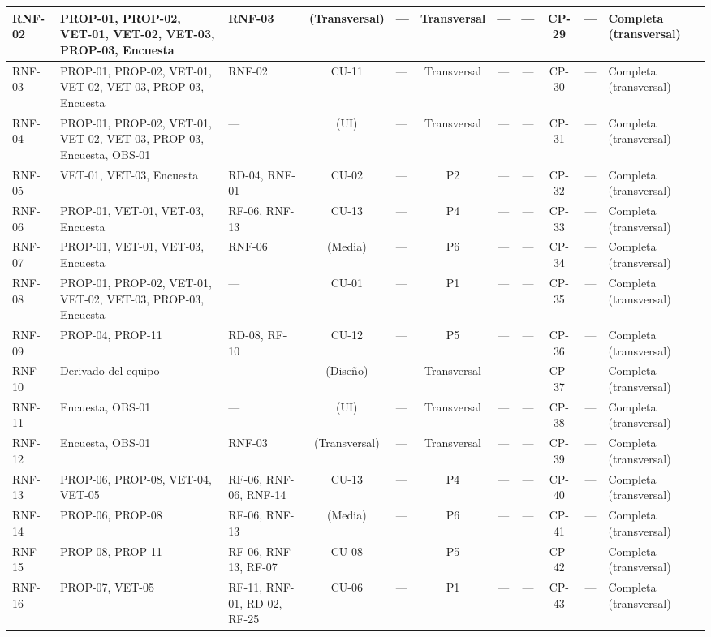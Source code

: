 \documentclass[journal,onecolumn]{IEEEtran}
\begin{document}
\begin{landscape}
\begin{table}[H]
\begin{tabularx}{\linewidth}{|l|X|X|c|X|c|c|c|c|c|X|}
			RNF-02 & PROP-01, PROP-02, VET-01, VET-02, VET-03, PROP-03, Encuesta & RNF-03 & (Transversal) & --- & Transversal & --- & --- & CP-29 & --- & Completa (transversal) \\ \hline
			RNF-03 & PROP-01, PROP-02, VET-01, VET-02, VET-03, PROP-03, Encuesta & RNF-02 & CU-11 & --- & Transversal & --- & --- & CP-30 & --- & Completa (transversal) \\ \hline
			RNF-04 & PROP-01, PROP-02, VET-01, VET-02, VET-03, PROP-03, Encuesta, OBS-01 & --- & (UI) & --- & Transversal & --- & --- & CP-31 & --- & Completa (transversal) \\ \hline
			RNF-05 & VET-01, VET-03, Encuesta & RD-04, RNF-01 & CU-02 & --- & P2 & --- & --- & CP-32 & --- & Completa (transversal) \\ \hline
			RNF-06 & PROP-01, VET-01, VET-03, Encuesta & RF-06, RNF-13 & CU-13 & --- & P4 & --- & --- & CP-33 & --- & Completa (transversal) \\ \hline
			RNF-07 & PROP-01, VET-01, VET-03, Encuesta & RNF-06 & (Media) & --- & P6 & --- & --- & CP-34 & --- & Completa (transversal) \\ \hline
			RNF-08 & PROP-01, PROP-02, VET-01, VET-02, VET-03, PROP-03, Encuesta & --- & CU-01 & --- & P1 & --- & --- & CP-35 & --- & Completa (transversal) \\ \hline
			RNF-09 & PROP-04, PROP-11 & RD-08, RF-10 & CU-12 & --- & P5 & --- & --- & CP-36 & --- & Completa (transversal) \\ \hline
			RNF-10 & Derivado del equipo & --- & (Diseño) & --- & Transversal & --- & --- & CP-37 & --- & Completa (transversal) \\ \hline
			RNF-11 & Encuesta, OBS-01 & --- & (UI) & --- & Transversal & --- & --- & CP-38 & --- & Completa (transversal) \\ \hline
			RNF-12 & Encuesta, OBS-01 & RNF-03 & (Transversal) & --- & Transversal & --- & --- & CP-39 & --- & Completa (transversal) \\ \hline
			RNF-13 & PROP-06, PROP-08, VET-04, VET-05 & RF-06, RNF-06, RNF-14 & CU-13 & --- & P4 & --- & --- & CP-40 & --- & Completa (transversal) \\ \hline
			RNF-14 & PROP-06, PROP-08 & RF-06, RNF-13 & (Media) & --- & P6 & --- & --- & CP-41 & --- & Completa (transversal) \\ \hline
			RNF-15 & PROP-08, PROP-11 & RF-06, RNF-13, RF-07 & CU-08 & --- & P5 & --- & --- & CP-42 & --- & Completa (transversal) \\ \hline
			RNF-16 & PROP-07, VET-05 & RF-11, RNF-01, RD-02, RF-25 & CU-06 & --- & P1 & --- & --- & CP-43 & --- & Completa (transversal) \\ \hline
		\end{tabularx}
	\end{table}
\end{landscape}
\end{document}
